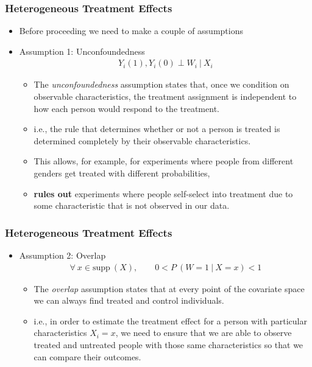 \documentclass[
  shownotes,
  xcolor={svgnames},
  hyperref={colorlinks,citecolor=DarkBlue,linkcolor=DarkRed,urlcolor=DarkBlue}
  , aspectratio=169]{beamer}
\begin{document}
\begin{frame}[fragile]
\frametitle{Heterogeneous Treatment Effects}

\begin{itemize}
\item Before proceeding we need to make a couple of assumptions




\item Assumption 1: Unconfoundedness
\begin{align}
Y_i(1), Y_i(0) \perp W_i \ | \ X_i
\end{align}
\begin{itemize}
\item The \emph{unconfoundedness} assumption states that, once we condition on observable characteristics, the treatment assignment is independent to
how each person would respond to the treatment. 
\item i.e.,  the rule that determines whether or not a person is treated is determined completely by their observable characteristics. 
\item This allows, for example, for experiments where people from different genders get treated with different probabilities, 
\item {\bf rules out} experiments where people self-select into treatment due to some characteristic that is not observed in our data.

\end{itemize}


\end{itemize}




\end{frame}
\begin{frame}[fragile]
\frametitle{Heterogeneous Treatment Effects}

\begin{itemize}
\item Assumption 2: Overlap
\medskip
\begin{align}
\forall \ x \in \text{supp}\ (X), \qquad 0 < P\ (W = 1 \ | \ X = x)  < 1
\end{align}

  \begin{itemize}
  \item The \emph{overlap} assumption states that at every point of the covariate space we can always find treated and control individuals.
  \medskip
  \item  i.e., in order to estimate the treatment effect for a person with particular  characteristics \(X_{i} = x\), we need to ensure that we are able to
  observe treated and untreated people with those same characteristics so that we can compare their outcomes. 
  \end{itemize}
\end{itemize}




\end{frame}
\end{document}
